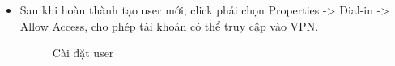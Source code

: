 \begin{itemize}
    \item Sau khi hoàn thành tạo user mới, click phải chọn Properties -> Dial-in -> Allow Access, cho phép tài khoản có thể truy cập vào VPN.
        
        \begin{figure}[htbp]
            \hfill
            \hfill
            \caption{Cài đặt user}
        \end{figure}
        

\end{itemize}
